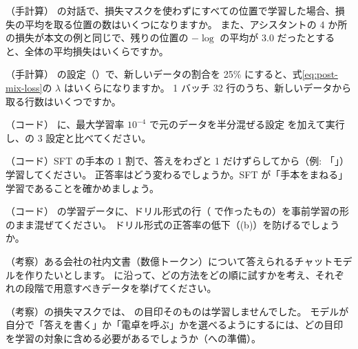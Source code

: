 \begin{exercises}
\item （手計算）
の対話で、損失マスクを使わずにすべての位置で学習した場合、損失の平均を取る位置の数はいくつになりますか。
また、アシスタントの 4 か所の損失が本文の例と同じで、残りの位置の $-\log$ の平均が 3.0 だったとすると、全体の平均損失はいくらですか。
\item （手計算） の設定（）で、新しいデータの割合を 25\% にすると、式\eqref{eq:post-mix-loss}の $\lambda$ はいくらになりますか。
1 バッチ 32 行のうち、新しいデータから取る行数はいくつですか。
\item （コード） に、最大学習率 $10^{-4}$ で元のデータを半分混ぜる設定  を加えて実行し、の 3 設定と比べてください。
\item （コード）SFT の手本の 1 割で、答えをわざと 1 だけずらしてから（例: 「」）学習してください。
正答率はどう変わるでしょうか。SFT が「手本をまねる」学習であることを確かめましょう。
\item （コード） の学習データに、ドリル形式の行（ で作ったもの）を事前学習の形のまま混ぜてください。
ドリル形式の正答率の低下（(b)）を防げるでしょうか。
\item （考察）ある会社の社内文書（数億トークン）について答えられるチャットモデルを作りたいとします。
に沿って、どの方法をどの順に試すかを考え、それぞれの段階で用意すべきデータを挙げてください。
\item （考察）の損失マスクでは、 の目印そのものは学習しませんでした。
モデルが自分で「答えを書く」か「電卓を呼ぶ」かを選べるようにするには、どの目印を学習の対象に含める必要があるでしょうか（への準備）。
\end{exercises}
